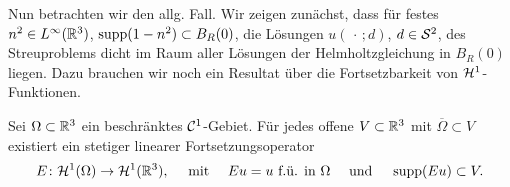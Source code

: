 Nun betrachten wir den allg. Fall. Wir zeigen zunächst, dass für festes \(n^2\in L^\infty(\mathbb{R}^3)\), \(\operatorname{supp}(1-n^2)\subset B_R(0)\), die Lösungen \(u(\,\cdot\,;d)\), \(d\in\mathcal{S}^2\), des Streuproblems dicht im Raum aller Lösungen der Helmholtzgleichung in \(B_R(0)\) liegen. Dazu brauchen wir noch ein Resultat über die Fortsetzbarkeit von \(\mathcal{H}^1\)-Funktionen.
\begin{satz}[Fortsetzungssatz]\label{satz: fortsetzungssatz}
	Sei \(\Omega\subset\mathbb{R}^3\) ein beschränktes \(\mathcal{C}^1\)-Gebiet. Für jedes offene \(V\subset\mathbb{R}^3\) mit \(\overline{\Omega}\subset V\) existiert ein stetiger linearer Fortsetzungsoperator
	\begin{equation*}
		E\colon\mathcal{H}^1(\Omega) \to \mathcal{H}^1(\mathbb{R}^3),\quad\text{ mit }\quad Eu=u\text{ f.ü. in }\Omega\quad\text{ und }\quad\operatorname{supp}(Eu)\subset V.
	\end{equation*}
\end{satz}
